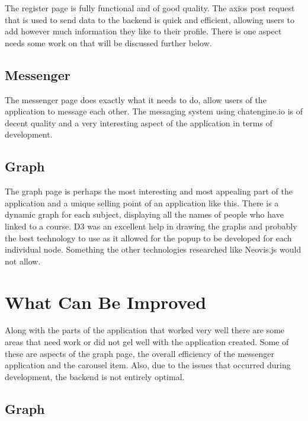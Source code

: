 The register page is fully functional and of good quality. The axios post request that is used to send data to the backend is quick and efficient, allowing users to add however much information they like to their profile. There is one aspect needs some work on that will be discussed further below.\\

\subsection{Messenger}

The messenger page does exactly what it needs to do, allow users of the application to message each other. The messaging system using chatengine.io is of decent quality and a very interesting aspect of the application in terms of development. \\

\subsection{Graph}

The graph page is perhaps the most interesting and most appealing part of the application and a unique selling point of an application like this. There is a dynamic graph for each subject, displaying all the names of people who have linked to a course. D3 was an excellent help in drawing the graphs and probably the best technology to use as it allowed for the popup to be developed for each individual node. Something the other technologies researched like Neovis.js would not allow. \\

\section{What Can Be Improved}

Along with the parts of the application that worked very well there are some areas that need work or did not gel well with the application created. Some of these are aspects of the graph page, the overall efficiency of the messenger application and the carousel item. Also, due to the issues that occurred during development, the backend is not entirely optimal. \\

\subsection{Graph}

